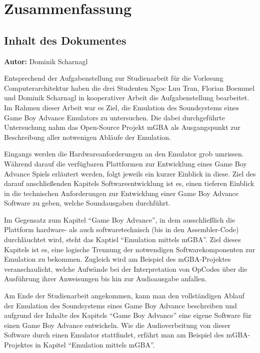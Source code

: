 \documentclass[11pt,a4paper]{scrartcl}
\newcommand{\AutorDominik} {
    \vspace{-4mm}
    \large \textbf{Autor:} Dominik Scharnagl \normalsize
    \vspace{2mm}
}
\begin{document}

\newpage
\section{Zusammenfassung} \label{Zusammenfassung}


\subsection{Inhalt des Dokumentes}
\AutorDominik

Entsprechend der Aufgabenstellung zur Studienarbeit f\"ur die Vorlesung Computerarchitektur haben die drei Studenten Ngoc Luu Tran, Florian Boemmel und Dominik Scharnagl in kooperativer Arbeit die Aufgabenstellung bearbeitet. Im Rahmen dieser Arbeit war es Ziel, die Emulation des Soundsystems eines Game Boy Advance Emulators zu untersuchen. Die dabei durchgef\"uhrte Untersuchung nahm das Open-Source Projekt mGBA als Ausgangspunkt zur Beschreibung aller notwenigen Abl\"aufe der Emulation.

Eingangs werden die Hardwareanforderungen an den Emulator grob umrissen. W\"ahrend darauf die verf\"ugbaren Plattformen zur Entwicklung eines Game Boy Advance Spiels erl\"autert werden, folgt jeweils ein kurzer Einblick in diese. Ziel des darauf anschlie{\ss}enden Kapitels Softwareentwicklung ist es, einen tieferen Einblick in die technischen Anforderungen zur Entwicklung einer Game Boy Advance Software zu geben, welche Soundausgaben durchf\"uhrt.

Im Gegensatz zum Kapitel \enquote{Game Boy Advance}, in dem ausschlie{\ss}lich die Plattform hardware- als auch softwaretechnisch (bis in den Assembler-Code) durchl\"auchtet wird, steht das Kaptiel \enquote{Emulation mittels mGBA}. Ziel dieses Kapitels ist es, eine logische Trennung der notwendigen Softwarekomponenten zur Emulation zu bekommen. Zugleich wird am Beispiel des mGBA-Projektes veranschaulicht, welche Aufw\"ande bei der Interpretation von OpCodes \"uber die Ausf\"uhrung ihrer Anweisungen bis hin zur Audioausgabe anfallen.

Am Ende der Studienarbeit angekommen, kann man den vollst\"andigen Ablauf der Emulation des Soundsystems eines Game Boy Advance beschreiben und aufgrund der Inhalte des Kapitels \enquote{Game Boy Advance} eine eigene Software f\"ur einen Game Boy Advance entwickeln. Wie die Audioverbeitung von dieser Software durch einen Emulator stattfindet, erf\"ahrt man am Beispiel des mGBA-Projektes in Kapitel \enquote{Emulation mittels mGBA}.
\end{document}

